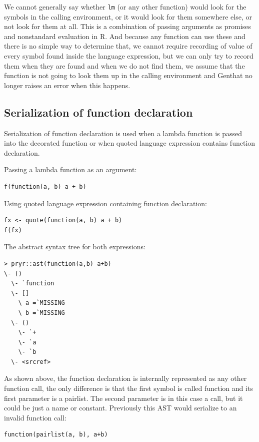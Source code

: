 \documentclass[thesis=B,english]{FITthesis}[2012/10/20]
\begin{document}
We cannot generally say whether \verb|lm| (or any other function) would look for the symbols in the calling environment, or it would look for them somewhere else, or not look for them at all. This is a combination of passing arguments as promises and nonstandard evaluation in R. And because any function can use these and there is no simple way to determine that, we cannot require recording of value of every symbol found inside the language expression, but we can only try to record them when they are found and when we do not find them, we assume that the function is not going to look them up in the calling environment and Genthat no longer raises an error when this happens. 

\subsection{Serialization of function declaration} \label{ssub:clos2}
Serialization of function declaration is used when a lambda function is passed into the decorated function or when quoted language expression contains function declaration.

Passing a lambda function as an argument:

\begin{verbatim}
f(function(a, b) a + b)
\end{verbatim}

Using quoted language expression containing function declaration:

\begin{verbatim}
fx <- quote(function(a, b) a + b)
f(fx)
\end{verbatim}

The abstract syntax tree for both expressions:

\begin{verbatim}
> pryr::ast(function(a,b) a+b)
\- ()
  \- `function
  \- []
    \ a =`MISSING
    \ b =`MISSING
  \- ()
    \- `+
    \- `a
    \- `b
  \- <srcref> 
\end{verbatim}

As shown above, the function declaration is internally represented as any other function call, the only difference is that the first symbol is called function and its first parameter is a pairlist. The second parameter is in this case a call, but it could be just a name or constant. Previously this AST would serialize to an invalid function call:

\begin{verbatim}
function(pairlist(a, b), a+b)
\end{verbatim}
\end{document}
